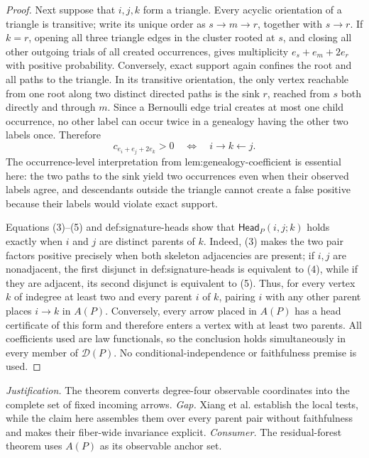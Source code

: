 \documentclass{article}
\begin{document}
\begin{proof}
Next suppose that \(i,j,k\) form a triangle.  Every acyclic orientation of a triangle is transitive; write its unique order as \(s\to m\to r\), together with \(s\to r\).  If \(k=r\), opening all three triangle edges in the cluster rooted at \(s\), and closing all other outgoing trials of all created occurrences, gives multiplicity \(e_s+e_m+2e_r\) with positive probability.  Conversely, exact support again confines the root and all paths to the triangle.  In its transitive orientation, the only vertex reachable from one root along two distinct directed paths is the sink \(r\), reached from \(s\) both directly and through \(m\).  Since a Bernoulli edge trial creates at most one child occurrence, no other label can occur twice in a genealogy having the other two labels once.  Therefore
\[
 c_{e_i+e_j+2e_k}>0
 \quad\Longleftrightarrow\quad
 i\to k\leftarrow j.
\tag{5}
\]
The occurrence-level interpretation from lem:genealogy-coefficient is essential here: the two paths to the sink yield two occurrences even when their observed labels agree, and descendants outside the triangle cannot create a false positive because their labels would violate exact support.

Equations (3)--(5) and def:signature-heads show that \(\mathsf{Head}_P(i,j;k)\) holds exactly when \(i\) and \(j\) are distinct parents of \(k\).  Indeed, (3) makes the two pair factors positive precisely when both skeleton adjacencies are present; if \(i,j\) are nonadjacent, the first disjunct in def:signature-heads is equivalent to (4), while if they are adjacent, its second disjunct is equivalent to (5).  Thus, for every vertex \(k\) of indegree at least two and every parent \(i\) of \(k\), pairing \(i\) with any other parent places \(i\to k\) in \(A(P)\).  Conversely, every arrow placed in \(A(P)\) has a head certificate of this form and therefore enters a vertex with at least two parents.  All coefficients used are law functionals, so the conclusion holds simultaneously in every member of \(\mathcal D(P)\).  No conditional-independence or faithfulness premise is used.
\end{proof}
\par\smallskip\noindent \textit{Justification.} The theorem converts degree-four observable coordinates into the complete set of fixed incoming arrows. \textit{Gap.} Xiang et al. establish the local tests, while the claim here assembles them over every parent pair without faithfulness and makes their fiber-wide invariance explicit. \textit{Consumer.} The residual-forest theorem uses \(A(P)\) as its observable anchor set.
\end{document}
